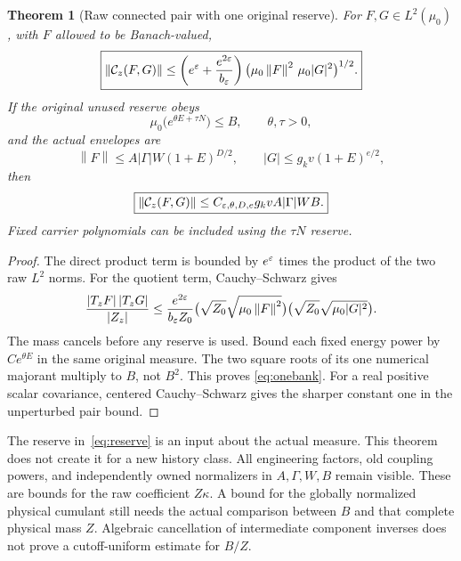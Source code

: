 \documentclass[11pt,letterpaper]{article}
\theoremstyle{plain}
\newtheorem{theorem}{Theorem}[section]
\theoremstyle{remark}\newtheorem{remark}[theorem]{Scope}
\newcommand{\norm}[1]{\left\lVert#1\right\rVert}
\begin{document}
\begin{theorem}[Raw connected pair with one original reserve]
For $F,G\in L^2(\mu_0)$, with $F$ allowed to be Banach-valued,
\begin{equation}
\boxed{
\norm{\cC_z(F,G)}\le
\left(e^\eps+\frac{e^{2\eps}}{b_\eps}\right)
\bigl(\mu_0\norm{F}^2\,\mu_0|G|^2\bigr)^{1/2}.}
\label{eq:pairbound}
\end{equation}
If the original unused reserve obeys
\begin{equation}
\mu_0\bigl(e^{\theta E+\tau N}\bigr)\le B,
\qquad \theta,\tau>0,
\label{eq:reserve}
\end{equation}
and the actual envelopes are
\begin{equation}
\norm{F}\le A|\Gamma|W(1+E)^{D/2},\qquad
|G|\le g_kv(1+E)^{e/2},
\label{eq:envelopes}
\end{equation}
then
\begin{equation}
\boxed{\norm{\cC_z(F,G)}\le C_{\eps,\theta,D,e}
g_kvA|\Gamma|WB.}
\label{eq:onebank}
\end{equation}
Fixed carrier polynomials can be included using the $\tau N$ reserve.
\end{theorem}
\begin{proof}
The direct product term is bounded by $e^\varepsilon$ times the product of the two
raw $L^2$ norms. For the quotient term, Cauchy--Schwarz gives
\[
\frac{|T_zF|\,|T_zG|}{|Z_z|}
\le\frac{e^{2\eps}}{b_\eps Z_0}
\bigl(\sqrt{Z_0}\sqrt{\mu_0\norm F^2}\bigr)
\bigl(\sqrt{Z_0}\sqrt{\mu_0|G|^2}\bigr).
\]
The mass cancels before any reserve is used. Bound each fixed energy power by
$C e^{\theta E}$ in the same original measure. The two square roots of its
one numerical majorant multiply to $B$, not $B^2$. This proves
\eqref{eq:onebank}. For a real positive scalar covariance, centered
Cauchy--Schwarz gives the sharper constant one in the unperturbed pair bound.
\end{proof}

The reserve in~\eqref{eq:reserve} is an input about the actual measure. This
theorem does not create it for a new history class. All engineering factors,
old coupling powers, and independently owned normalizers in $A,\Gamma,W,B$
remain visible.
These are bounds for the raw coefficient $Z\kappa$. A bound for the globally
normalized physical cumulant still needs the actual comparison between $B$
and that complete physical mass $Z$. Algebraic cancellation of intermediate
component inverses does not prove a cutoff-uniform estimate for $B/Z$.
\end{document}
